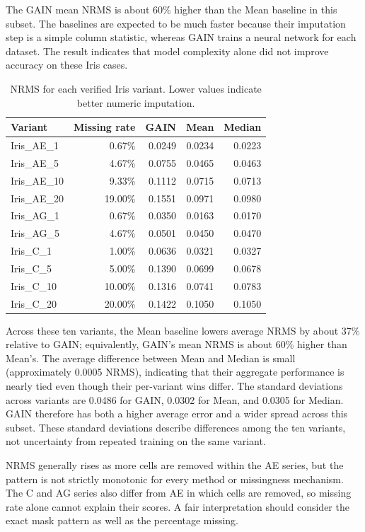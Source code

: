 \documentclass[11pt]{article}
\begin{document}
The GAIN mean NRMS is about 60\% higher than the Mean baseline in this subset. The baselines are expected to be much faster because their imputation step is a simple column statistic, whereas GAIN trains a neural network for each dataset. The result indicates that model complexity alone did not improve accuracy on these Iris cases.

\begin{table}[ht]
\centering
\small
\caption{NRMS for each verified Iris variant. Lower values indicate better numeric imputation.}
\label{tab:iris-detail}
\begin{tabular}{lrrrr}
\toprule
Variant & Missing rate & GAIN & Mean & Median \\
\midrule
Iris\_AE\_1  & 0.67\% & 0.0249 & 0.0234 & 0.0223 \\
Iris\_AE\_5  & 4.67\% & 0.0755 & 0.0465 & 0.0463 \\
Iris\_AE\_10 & 9.33\% & 0.1112 & 0.0715 & 0.0713 \\
Iris\_AE\_20 & 19.00\% & 0.1551 & 0.0971 & 0.0980 \\
Iris\_AG\_1  & 0.67\% & 0.0350 & 0.0163 & 0.0170 \\
Iris\_AG\_5  & 4.67\% & 0.0501 & 0.0450 & 0.0470 \\
Iris\_C\_1   & 1.00\% & 0.0636 & 0.0321 & 0.0327 \\
Iris\_C\_5   & 5.00\% & 0.1390 & 0.0699 & 0.0678 \\
Iris\_C\_10  & 10.00\% & 0.1316 & 0.0741 & 0.0783 \\
Iris\_C\_20  & 20.00\% & 0.1422 & 0.1050 & 0.1050 \\
\bottomrule
\end{tabular}
\end{table}

Across these ten variants, the Mean baseline lowers average NRMS by about 37\% relative to GAIN; equivalently, GAIN's mean NRMS is about 60\% higher than Mean's. The average difference between Mean and Median is small (approximately 0.0005 NRMS), indicating that their aggregate performance is nearly tied even though their per-variant wins differ. The standard deviations across variants are 0.0486 for GAIN, 0.0302 for Mean, and 0.0305 for Median. GAIN therefore has both a higher average error and a wider spread across this subset. These standard deviations describe differences among the ten variants, not uncertainty from repeated training on the same variant.

NRMS generally rises as more cells are removed within the AE series, but the pattern is not strictly monotonic for every method or missingness mechanism. The C and AG series also differ from AE in which cells are removed, so missing rate alone cannot explain their scores. A fair interpretation should consider the exact mask pattern as well as the percentage missing.
\end{document}

